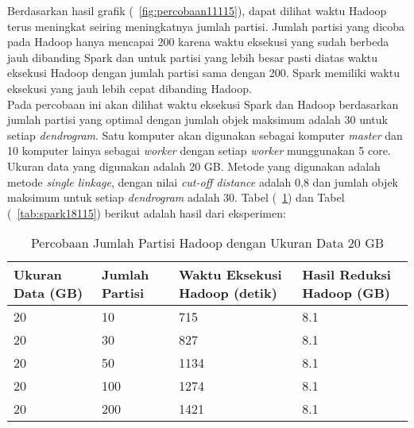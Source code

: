 Berdasarkan hasil grafik (~\ref{fig:percobaan11115}), dapat dilihat waktu Hadoop terus meningkat seiring meningkatnya jumlah partisi. Jumlah partisi yang dicoba pada Hadoop hanya mencapai 200 karena waktu eksekusi yang sudah berbeda jauh dibanding Spark dan untuk partisi yang lebih besar pasti diatas waktu eksekusi Hadoop dengan jumlah partisi sama dengan 200. Spark memiliki waktu eksekusi yang jauh lebih cepat dibanding Hadoop. \\




Pada percobaan ini akan dilihat waktu eksekusi Spark dan Hadoop berdasarkan jumlah partisi yang optimal dengan jumlah objek maksimum adalah 30 untuk setiap \textit{dendrogram}. Satu komputer akan digunakan sebagai komputer \textit{master} dan 10 komputer lainya sebagai \textit{worker} dengan setiap \textit{worker} munggunakan 5 core. Ukuran data yang digunakan adalah 20 GB. Metode yang digunakan adalah metode \textit{single linkage}, dengan nilai \textit{cut-off distance} adalah 0,8 dan jumlah objek maksimum untuk setiap \textit{dendrogram} adalah 30. Tabel (~\ref{tab:spark17115}) dan Tabel (~\ref{tab:spark18115}) berikut adalah hasil dari eksperimen:





\begin{table}[H] 
	\centering 
	\caption{Percobaan Jumlah Partisi Hadoop dengan Ukuran Data 20 GB}
	\label{tab:spark17115}
	\begin{tabular}{|p{3cm}|p{3cm}|p{4cm}|p{4cm}|}
\hline
Ukuran Data (GB) & Jumlah Partisi &  Waktu Eksekusi Hadoop (detik) & Hasil Reduksi Hadoop (GB)\\
\hline
20 & 10 & 715  & 8.1  \\
\hline
20 & 30 & 827  & 8.1  \\
\hline
20 & 50 & 1134  & 8.1  \\
\hline
20 & 100 & 1274  & 8.1  \\
\hline
20 & 200 & 1421 & 8.1  \\
\hline


\hline

	\end{tabular} 
\end{table}




